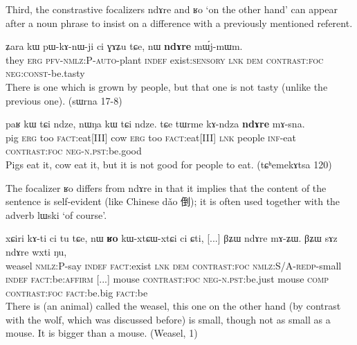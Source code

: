 \documentclass[oldfontcommands,oneside,a4paper,11pt]{article}
\newcommand{\ipa}[1]{{\phon \mbox{#1}}} %
\newcommand{\zh}[1]{{\cn #1}}
\begin{document}
Third, the constrastive focalizers \ipa{ndɤre}  and \ipa{ʁo}  `on the other hand' can appear after a noun phrase to insist on a difference with a previously mentioned referent.


\begin{exe}
\ex \label{ex:ndAre.mWjmWm}
\gll
\ipa{ʑara}  	\ipa{kɯ}  	\ipa{pɯ-kɤ-nɯ-ji}  	\ipa{ci}  	\ipa{ɣɤʑu}  	\ipa{tɕe,}  	\ipa{nɯ}  	\ipa{\textbf{ndɤre}}  	\ipa{mɯ́j-mɯm.}  \\
they \textsc{erg} \textsc{pfv-nmlz:P-auto}-plant \textsc{indef} exist:\textsc{sensory} \textsc{lnk} \textsc{dem} \textsc{contrast:foc} \textsc{neg:const}-be.tasty \\
\glt There is one which is grown by people, but that one is not tasty (unlike the previous one). (sɯrna 17-8)
\end{exe}

\begin{exe}
\ex \label{ex:ndAre.mAsna}
\gll
\ipa{paʁ}    	\ipa{kɯ}    	\ipa{tɕi}    	\ipa{ndze,}    	\ipa{nɯŋa}    	\ipa{kɯ}    	\ipa{tɕi}    	\ipa{ndze.}    	\ipa{tɕe}    	\ipa{tɯrme}    	\ipa{kɤ-ndza}    	\ipa{\textbf{ndɤre}}    	\ipa{mɤ-sna.}    \\
pig \textsc{erg} too \textsc{fact}:eat[III] cow  \textsc{erg} too \textsc{fact}:eat[III] \textsc{lnk} people \textsc{inf}-eat  \textsc{contrast:foc}  \textsc{neg-n.pst}:be.good \\
\glt Pigs eat it, cow eat it, but it is not good for people to eat. (tɕʰemekɤtsa 120)
\end{exe}

The focalizer \ipa{ʁo} differs from \ipa{ndɤre} in that it implies that the content of the sentence is self-evident (like Chinese \ipa{dǎo} \zh{倒}); it is often used together with the adverb \ipa{lɯski} `of course'.

\begin{exe}
\ex \label{ex:Ro.ndAre}
\gll
\ipa{xɕiri}    	\ipa{kɤ-ti}    	\ipa{ci}    	\ipa{tu}    	\ipa{tɕe,}    	\ipa{nɯ}    	\ipa{\textbf{ʁo}}    	\ipa{kɯ-xtɕɯ-xtɕi}    	\ipa{ci}    	\ipa{ɕti,}    	 [...] 	\ipa{βʑɯ}    	\ipa{ndɤre}    	\ipa{mɤ-ʑɯ.}    	\ipa{βʑɯ}    	\ipa{sɤz}    	\ipa{ndɤre}    	\ipa{wxti}    	\ipa{ŋu,}   \\
weasel \textsc{nmlz:P}-say \textsc{indef} \textsc{fact}:exist \textsc{lnk} \textsc{dem} \textsc{contrast:foc} \textsc{nmlz:S/A-redp}-small \textsc{indef} \textsc{fact}:be:\textsc{affirm} [...] mouse \textsc{contrast:foc} \textsc{neg-n.pst}:be.just mouse \textsc{comp} \textsc{contrast:foc} \textsc{fact}:be.big \textsc{fact}:be \\
\glt There is (an animal) called the weasel, this one on the other hand (by contrast with the wolf, which was discussed before) is small, though not as small as a mouse. It is bigger than a mouse. (Weasel, 1)
\end{exe}
\end{document}
